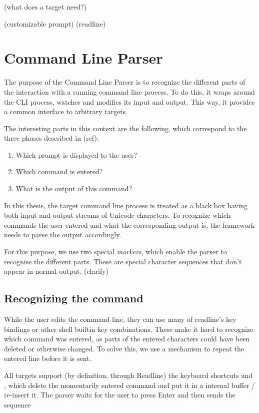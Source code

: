 \documentclass[twoside,parskip]{scrreprt}
\begin{document}
(what does a target need?)

(customizable prompt)
(readline)

\chapter{Command Line Parser}

The purpose of the Command Line Parser is to recognize the different parts of the interaction with a running command line process. To do this, it wraps around the \textsc{CLI} process, watches and modifies its input and output. This way, it provides a common interface to arbitrary targets.

The interesting parts in this context are the following, which correspond to the three phases described in (ref):

\begin{enumerate}
    \item Which prompt is displayed to the user?
    \item Which command is entered?
    \item What is the output of this command?
\end{enumerate}

In this thesis, the target command line process is treated as a black box having both input and output streams of Unicode characters. To recognize which commands the user entered and what the corresponding output is, the framework needs to parse the output accordingly.

For this purpose, we use two special \emph{markers}, which enable the parser to recognise the different parts. These are special character sequences that don't appear in normal output. (clarify)

\section{Recognizing the command}

While the user edits the command line, they can use many of readline's key bindings or other shell builtin key combinations. These make it hard to recognize which command was entered, as parts of the entered characters could have been deleted or otherwise changed. To solve this, we use a mechanism to repeat the entered line before it is sent.

All targets support (by definition, through Readline) the keyboard shortcuts  and , which delete the momentarily entered command and put it in a internal buffer / re-insert it. The parser waits for the user to press Enter and then sends the sequence
\end{document}
